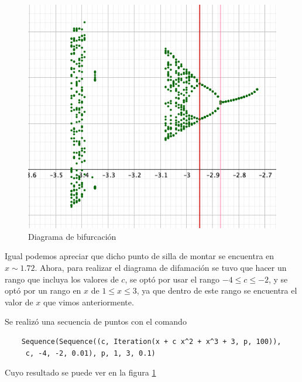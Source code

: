 \documentclass[11pt]{report}
\theoremstyle{plain}
\theoremstyle{definition}
\begin{document}
\begin{figure}[!h] %
	\centering
	\includegraphics[scale=0.3]{caos_1_2.png}
	\caption{Diagrama de bifurcación}
	\label{fig:Eje1_2}
\end{figure}

Igual podemos apreciar que dicho punto de silla de montar se encuentra en $x\sim 1.72$. Ahora, para realizar el diagrama de difamación se tuvo que hacer un rango que incluya los valores de $c$, se optó por usar el rango $-4\leq c \leq-2$, y se optó por un rango en $x$ de $1\leq x \leq 3$, ya que dentro de este rango se encuentra el valor de $x$ que vimos anteriormente.

Se realizó una secuencia de puntos con el comando
\begin{verbatim}
	Sequence(Sequence((c, Iteration(x + c x^2 + x^3 + 3, p, 100)),
	 c, -4, -2, 0.01), p, 1, 3, 0.1)
\end{verbatim}
Cuyo resultado se puede ver en la figura \ref{fig:Eje1_2}
\end{document}
